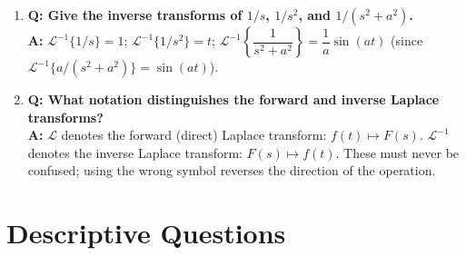 \documentclass[12pt,a4paper]{article}
\begin{document}
\begin{enumerate}
\item \textbf{Q: Give the inverse transforms of $1/s$, $1/s^2$, and $1/(s^2+a^2)$.}\\
\textbf{A:}
$\mathcal{L}^{-1}\{1/s\}=1$; \quad
$\mathcal{L}^{-1}\{1/s^2\}=t$; \quad
$\mathcal{L}^{-1}\!\left\{\dfrac{1}{s^2+a^2}\right\}=\dfrac{1}{a}\sin(at)$\; (since $\mathcal{L}^{-1}\{a/(s^2+a^2)\}=\sin(at)$).

\item \textbf{Q: What notation distinguishes the forward and inverse Laplace transforms?}\\
\textbf{A:} $\mathcal{L}$ denotes the forward (direct) Laplace transform:
$f(t)\mapsto F(s)$. $\mathcal{L}^{-1}$ denotes the inverse Laplace transform:
$F(s)\mapsto f(t)$. These must never be confused; using the wrong symbol
reverses the direction of the operation.

\end{enumerate}

\section{Descriptive Questions}
\end{document}
